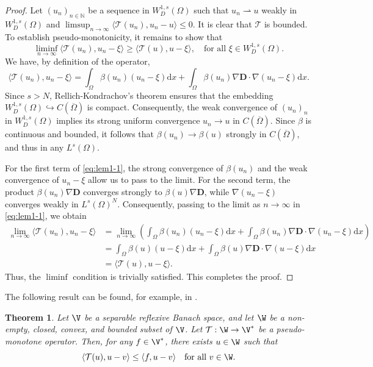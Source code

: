 \documentclass[final,reqno]{amsart}
\theoremstyle{plain}
\newtheorem{theorem}{Theorem}	%
\theoremstyle{definition}
\theoremstyle{remark}
\numberwithin{remark}{section}	%
\numberwithin{example}{section}	%
\newcommand{\de}{\mathbf{D}}
\newcommand{\Om}{\Omega}
\newcommand{\T}{\mathcal T}
\newcommand{\dd}{\mathrm{d}}
\begin{document}
\begin{proof}
Let $(u_n)_{n \in \mathbb{N}}$ be a sequence in $W^{1,s}_{D}(\Omega)$ such that $u_n \rightharpoonup u$ weakly in $W^{1,s}_{D}(\Omega)$ and $\limsup_{n \to \infty} \langle\T(u_n),u_n-u\rangle \leq 0$. It is clear that $\T$ is bounded. To establish pseudo-monotonicity, it remains to show that
\[
    \liminf_{n\to\infty} \langle\T(u_n),u_n-\xi\rangle \geq \langle\T(u),u-\xi\rangle, \quad \mbox{for all } \xi \in W^{1,s}_{D}(\Omega).
\]
We have, by definition of the operator,
\begin{equation}\label{eq:lem1-1}
	\langle\T(u_n),u_n-\xi\rangle = \int_{\Om}\beta(u_n) (u_n - \xi)\dd x + \int_{\Om}\beta(u_n)\nabla\de\cdot\nabla(u_n-\xi)\dd x.
\end{equation}
Since $s>N$, Rellich-Kondrachov's theorem ensures that the embedding $W^{1,s}_{D}(\Omega) \hookrightarrow C(\overline{\Omega})$ is compact. Consequently, the weak convergence of $(u_n)_n$ in $W^{1,s}_{D}(\Omega)$ implies its strong uniform convergence $u_n \to u$ in $C(\overline{\Omega})$. Since $\beta$ is continuous and bounded, it follows that $\beta(u_n) \to \beta(u)$ strongly in $C(\overline{\Omega})$, and thus in any $L^s(\Omega)$. 

For the first term of \eqref{eq:lem1-1}, the strong convergence of $\beta(u_n)$ and the weak convergence of $u_n - \xi$ allow us to pass to the limit. For the second term, the product $\beta(u_n)\nabla\de$ converges strongly to $\beta(u)\nabla\de$, while $\nabla(u_n-\xi)$ converges weakly in $L^s(\Omega)^N$. Consequently, passing to the limit as $n \to \infty$ in \eqref{eq:lem1-1}, we obtain
\begin{equation*}
\begin{aligned}
    \lim_{n \to \infty} \langle\T(u_n),u_n-\xi\rangle &= \lim_{n \to \infty} \left( \int_{\Om}\beta(u_n) (u_n - \xi)\dd x + \int_{\Om}\beta(u_n)\nabla\de\cdot\nabla(u_n-\xi)\dd x \right) \\
    &= \int_{\Om}\beta(u) (u - \xi)\dd x + \int_{\Om}\beta(u)\nabla\de\cdot\nabla(u-\xi)\dd x \\
    &= \langle\T(u),u-\xi\rangle.
\end{aligned}
\end{equation*}
Thus, the $\liminf$ condition is trivially satisfied. This completes the proof.
\end{proof}
The following result can be found, for example, in \cite[Theorem 8.1]{LionsLivre}.
\begin{theorem}\label{thm:app-thm1}
Let $\V$ be a separable reflexive Banach space, and let $\W$ be a non-empty, closed, convex, and bounded subset of $\V$. Let $\T:\W\to\V^*$ be a pseudo-monotone operator. Then, for any $f\in\V^{*}$, there exists $u\in\W$ such that 
\[
    \langle\T(u),u-v\rangle \leq \langle f,u-v\rangle \quad \text{for all } v\in \W.
\]
\end{theorem}
\end{document}
